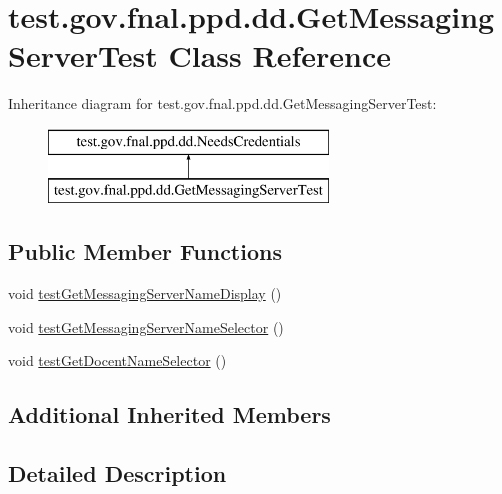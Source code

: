\hypertarget{classtest_1_1gov_1_1fnal_1_1ppd_1_1dd_1_1GetMessagingServerTest}{\section{test.\-gov.\-fnal.\-ppd.\-dd.\-Get\-Messaging\-Server\-Test Class Reference}
\label{classtest_1_1gov_1_1fnal_1_1ppd_1_1dd_1_1GetMessagingServerTest}
}
Inheritance diagram for test.\-gov.\-fnal.\-ppd.\-dd.\-Get\-Messaging\-Server\-Test\-:\begin{figure}[H]
\begin{center}
\leavevmode
\includegraphics[height=2.000000cm]{classtest_1_1gov_1_1fnal_1_1ppd_1_1dd_1_1GetMessagingServerTest}
\end{center}
\end{figure}
\subsection*{Public Member Functions}
\begin{DoxyCompactItemize}
\item 
void \hyperlink{classtest_1_1gov_1_1fnal_1_1ppd_1_1dd_1_1GetMessagingServerTest_a3601b6819ca638d7b1a0363eaa6ca475}{test\-Get\-Messaging\-Server\-Name\-Display} ()
\item 
void \hyperlink{classtest_1_1gov_1_1fnal_1_1ppd_1_1dd_1_1GetMessagingServerTest_a087a371914143672310e30fc4b71decc}{test\-Get\-Messaging\-Server\-Name\-Selector} ()
\item 
void \hyperlink{classtest_1_1gov_1_1fnal_1_1ppd_1_1dd_1_1GetMessagingServerTest_a797ca314d02f3394cad4c88f95eee5bc}{test\-Get\-Docent\-Name\-Selector} ()
\end{DoxyCompactItemize}
\subsection*{Additional Inherited Members}


\subsection{Detailed Description}


